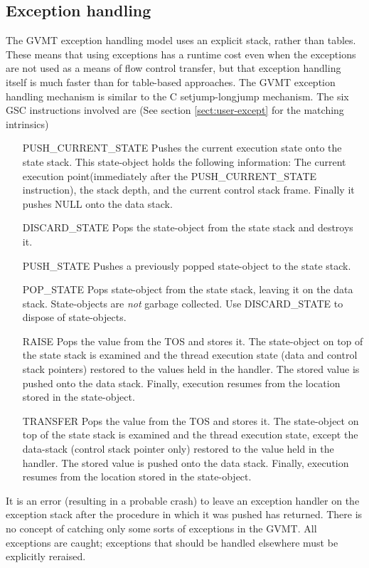 \subsection{Exception handling}
The GVMT exception handling model uses an explicit stack, rather than tables. These means that using exceptions has a runtime cost even when the exceptions are not used as a means of flow control transfer, but that exception handling itself is much faster than for table-based approaches. The GVMT exception handling mechanism is similar to the C setjump-longjump mechanism.
The six GSC instructions involved are (See section \ref{sect:user-except} for the matching intrinsics)
\begin{itemize}
\item [PUSH\_CURRENT\_STATE] Pushes the current execution state onto the state stack. This state-object holds the following information: The current execution point(immediately after the PUSH\_CURRENT\_STATE instruction), the stack depth, and the current control stack frame. Finally it pushes NULL onto the data stack. 
\item [DISCARD\_STATE] Pops the state-object from the state stack and destroys it.
\item [PUSH\_STATE] Pushes a previously popped state-object to the state stack.
\item [POP\_STATE] Pops state-object from the state stack, leaving it on the data stack. State-objects are \emph{not} garbage collected. 
Use  DISCARD\_STATE to dispose of state-objects.
\item [RAISE] Pops the value from the TOS and stores it. The state-object on top of the state stack is examined and the thread execution state (data and control stack pointers) restored to the values held in the handler. The stored value is pushed onto the data stack. Finally, execution resumes from the location stored in the state-object.
\item [TRANSFER] Pops the value from the TOS and stores it. The state-object on top of the state stack is examined and the thread execution state, except the data-stack (control stack pointer only) restored to the value held in the handler. The stored value is pushed onto the data stack. Finally, execution resumes from the location stored in the state-object.
\end{itemize}
It is an error (resulting in a probable crash) to leave an exception handler on the exception stack after the procedure in which it was pushed has returned.
There is no concept of catching only some sorts of exceptions in the GVMT. All exceptions are caught; exceptions that should be handled elsewhere must be explicitly reraised. 

